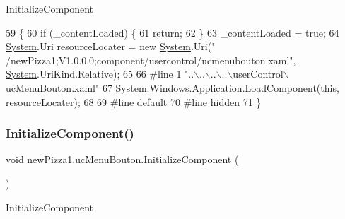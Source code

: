 Initialize\+Component 


\begin{DoxyCode}
59                                           \{
60             \textcolor{keywordflow}{if} (\_contentLoaded) \{
61                 \textcolor{keywordflow}{return};
62             \}
63             \_contentLoaded = \textcolor{keyword}{true};
64             \hyperlink{namespaceSystem}{System}.Uri resourceLocater = \textcolor{keyword}{new} \hyperlink{namespaceSystem}{System}.Uri(\textcolor{stringliteral}{"
      /newPizza1;V1.0.0.0;component/usercontrol/ucmenubouton.xaml"}, \hyperlink{namespaceSystem}{System}.UriKind.Relative);
65             
66 \textcolor{preprocessor}{            #line 1 "..\(\backslash\)..\(\backslash\)..\(\backslash\)..\(\backslash\)userControl\(\backslash\)ucMenuBouton.xaml"}
67             \hyperlink{namespaceSystem}{System}.Windows.Application.LoadComponent(\textcolor{keyword}{this}, resourceLocater);
68             
69 \textcolor{preprocessor}{            #line default}
70 \textcolor{preprocessor}{            #line hidden}
71         \}
\end{DoxyCode}
\mbox{\label{classnewPizza1_1_1ucMenuBouton_a080790946e454afc7d1441447a1e2313}} 
\subsubsection{\texorpdfstring{Initialize\+Component()}{InitializeComponent()}\hspace{0.1cm}{\footnotesize\ttfamily [4/6]}}
{\footnotesize\ttfamily void new\+Pizza1.\+uc\+Menu\+Bouton.\+Initialize\+Component (\begin{DoxyParamCaption}{ }\end{DoxyParamCaption})\hspace{0.3cm}{\ttfamily [inline]}}



Initialize\+Component 


